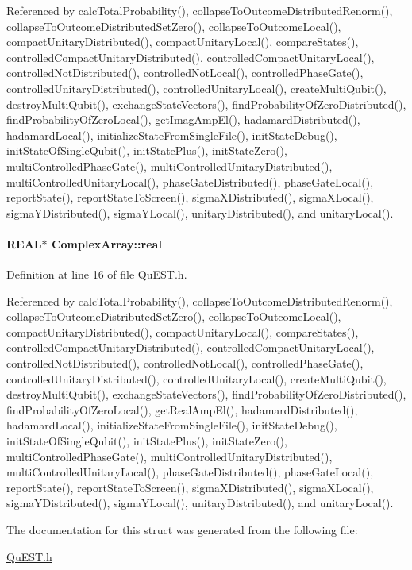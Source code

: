 Referenced by calcTotalProbability(), collapseToOutcomeDistributedRenorm(), collapseToOutcomeDistributedSetZero(), collapseToOutcomeLocal(), compactUnitaryDistributed(), compactUnitaryLocal(), compareStates(), controlledCompactUnitaryDistributed(), controlledCompactUnitaryLocal(), controlledNotDistributed(), controlledNotLocal(), controlledPhaseGate(), controlledUnitaryDistributed(), controlledUnitaryLocal(), createMultiQubit(), destroyMultiQubit(), exchangeStateVectors(), findProbabilityOfZeroDistributed(), findProbabilityOfZeroLocal(), getImagAmpEl(), hadamardDistributed(), hadamardLocal(), initializeStateFromSingleFile(), initStateDebug(), initStateOfSingleQubit(), initStatePlus(), initStateZero(), multiControlledPhaseGate(), multiControlledUnitaryDistributed(), multiControlledUnitaryLocal(), phaseGateDistributed(), phaseGateLocal(), reportState(), reportStateToScreen(), sigmaXDistributed(), sigmaXLocal(), sigmaYDistributed(), sigmaYLocal(), unitaryDistributed(), and unitaryLocal().\hypertarget{structComplexArray_a4195cac6c784ea1b6271f1c7dba1548a}{
\paragraph[{real}]{\setlength{\rightskip}{0pt plus 5cm}REAL$\ast$ {\bf ComplexArray::real}}\hfill}
\label{structComplexArray_a4195cac6c784ea1b6271f1c7dba1548a}


Definition at line 16 of file QuEST.h.

Referenced by calcTotalProbability(), collapseToOutcomeDistributedRenorm(), collapseToOutcomeDistributedSetZero(), collapseToOutcomeLocal(), compactUnitaryDistributed(), compactUnitaryLocal(), compareStates(), controlledCompactUnitaryDistributed(), controlledCompactUnitaryLocal(), controlledNotDistributed(), controlledNotLocal(), controlledPhaseGate(), controlledUnitaryDistributed(), controlledUnitaryLocal(), createMultiQubit(), destroyMultiQubit(), exchangeStateVectors(), findProbabilityOfZeroDistributed(), findProbabilityOfZeroLocal(), getRealAmpEl(), hadamardDistributed(), hadamardLocal(), initializeStateFromSingleFile(), initStateDebug(), initStateOfSingleQubit(), initStatePlus(), initStateZero(), multiControlledPhaseGate(), multiControlledUnitaryDistributed(), multiControlledUnitaryLocal(), phaseGateDistributed(), phaseGateLocal(), reportState(), reportStateToScreen(), sigmaXDistributed(), sigmaXLocal(), sigmaYDistributed(), sigmaYLocal(), unitaryDistributed(), and unitaryLocal().

The documentation for this struct was generated from the following file:\begin{DoxyCompactItemize}
\item 
\hyperlink{QuEST_8h}{QuEST.h}\end{DoxyCompactItemize}
